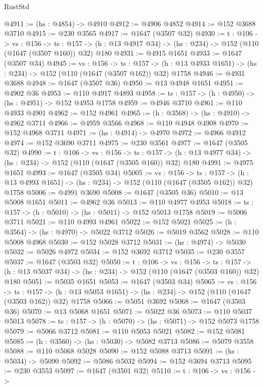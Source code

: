\begin{lexlean}{RustStd}
\begin{coremodule}
@4911 := (hs : @4854) -> @4910
@4912 := @4906 @4852
@4914 := @152 @3688 @3710
@4915 := @230 @3565
@4917 := @1647 (@3507 @32)
@4930 := {t : @106} ->
  {vs : @156} ->
  {ts : @157} -> (h : @13 @4917 @34) -> (hs : @234) -> @152 (@110 (@1647 (@3507 @160)) @32) @180
@4931 := @4915 @1651
@4933 := @1647 (@3507 @34)
@4945 := {vs : @156} ->
  {ts : @157} -> (h : @13 @4933 @1651) -> (hs : @234) -> @152 (@110 (@1647 (@3507 @162)) @32) @1758
@4946 := @4931 @3688
@4948 := @1647 (@3507 @36)
@4950 := @13 @4948 @1651
@4951 := @4902 @36
@4953 := @110 @4917 @4893
@4958 := {ts : @157} -> (h : @4950) -> (hs : @4951) -> @152 @4953 @1758
@4959 := @4946 @3710
@4961 := @110 @4933 @4901
@4962 := @152 @4961
@4965 := (h : @3568) -> (hs : @4910) -> @4962 @3711
@4966 := @4959 @3566
@4968 := @110 @4948 @4908
@4970 := @152 @4968 @3711
@4971 := (hs : @4914) -> @4970
@4972 := @4966 @4912
@4974 := @152 @3690 @3711
@4975 := @230 @3561
@4977 := @1647 (@3505 @32)
@4990 := {t : @106} ->
  {vs : @156} ->
  {ts : @157} -> (h : @13 @4977 @34) -> (hs : @234) -> @152 (@110 (@1647 (@3505 @160)) @32) @180
@4991 := @4975 @1651
@4993 := @1647 (@3505 @34)
@5005 := {vs : @156} ->
  {ts : @157} -> (h : @13 @4993 @1651) -> (hs : @234) -> @152 (@110 (@1647 (@3505 @162)) @32) @1758
@5006 := @4991 @3690
@5008 := @1647 (@3505 @36)
@5010 := @13 @5008 @1651
@5011 := @4962 @36
@5013 := @110 @4977 @4953
@5018 := {ts : @157} -> (h : @5010) -> (hs : @5011) -> @152 @5013 @1758
@5019 := @5006 @3711
@5021 := @110 @4993 @4961
@5022 := @152 @5021
@5025 := (h : @3564) -> (hs : @4970) -> @5022 @3712
@5026 := @5019 @3562
@5028 := @110 @5008 @4968
@5030 := @152 @5028 @3712
@5031 := (hs : @4974) -> @5030
@5032 := @5026 @4972
@5034 := @152 @3692 @3712
@5035 := @230 @3557
@5037 := @1647 (@3503 @32)
@5050 := {t : @106} ->
  {vs : @156} ->
  {ts : @157} -> (h : @13 @5037 @34) -> (hs : @234) -> @152 (@110 (@1647 (@3503 @160)) @32) @180
@5051 := @5035 @1651
@5053 := @1647 (@3503 @34)
@5065 := {vs : @156} ->
  {ts : @157} -> (h : @13 @5053 @1651) -> (hs : @234) -> @152 (@110 (@1647 (@3503 @162)) @32) @1758
@5066 := @5051 @3692
@5068 := @1647 (@3503 @36)
@5070 := @13 @5068 @1651
@5071 := @5022 @36
@5073 := @110 @5037 @5013
@5078 := {ts : @157} -> (h : @5070) -> (hs : @5071) -> @152 @5073 @1758
@5079 := @5066 @3712
@5081 := @110 @5053 @5021
@5082 := @152 @5081
@5085 := (h : @3560) -> (hs : @5030) -> @5082 @3713
@5086 := @5079 @3558
@5088 := @110 @5068 @5028
@5090 := @152 @5088 @3713
@5091 := (hs : @5034) -> @5090
@5092 := @5086 @5032
@5094 := @152 @3694 @3713
@5095 := @230 @3553
@5097 := @1647 (@3501 @32)
@5110 := {t : @106} ->
  {vs : @156} ->

\end{coremodule}
\end{lexlean}
